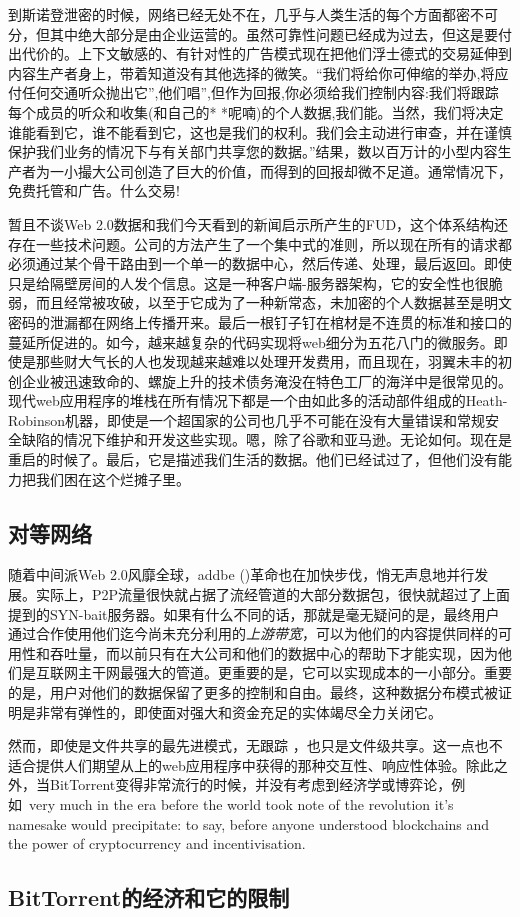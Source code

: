 到斯诺登泄密的时候，网络已经无处不在，几乎与人类生活的每个方面都密不可分，但其中绝大部分是由企业运营的。虽然可靠性问题已经成为过去，但这是要付出代价的。上下文敏感的、有针对性的广告模式现在把他们浮士德式的交易延伸到内容生产者身上，带着知道没有其他选择的微笑。“我们将给你可伸缩的举办,将应付任何交通听众抛出它”,他们唱”,但作为回报,你必须给我们控制内容:我们将跟踪每个成员的听众和收集(和自己的* *呢喃)的个人数据,我们能。当然，我们将决定谁能看到它，谁不能看到它，这也是我们的权利。我们会主动进行审查，并在谨慎保护我们业务的情况下与有关部门共享您的数据。”结果，数以百万计的小型内容生产者为一小撮大公司创造了巨大的价值，而得到的回报却微不足道。通常情况下，免费托管和广告。什么交易!

暂且不谈Web 2.0数据和我们今天看到的新闻启示所产生的FUD，这个体系结构还存在一些技术问题。公司的方法产生了一个集中式的准则，所以现在所有的请求都必须通过某个骨干路由到一个单一的数据中心，然后传递、处理，最后返回。即使只是给隔壁房间的人发个信息。这是一种客户端-服务器架构，它的安全性也很脆弱，而且经常被攻破，以至于它成为了一种新常态，未加密的个人数据甚至是明文密码的泄漏都在网络上传播开来。最后一根钉子钉在棺材是不连贯的标准和接口的蔓延所促进的。如今，越来越复杂的代码实现将web细分为五花八门的微服务。即使是那些财大气长的人也发现越来越难以处理开发费用，而且现在，羽翼未丰的初创企业被迅速致命的、螺旋上升的技术债务淹没在特色工厂的海洋中是很常见的。现代web应用程序的堆栈在所有情况下都是一个由如此多的活动部件组成的Heath-Robinson机器，即使是一个超国家的公司也几乎不可能在没有大量错误和常规安全缺陷的情况下维护和开发这些实现。嗯，除了谷歌和亚马逊。无论如何。现在是重启的时候了。最后，它是描述我们生活的数据。他们已经试过了，但他们没有能力把我们困在这个烂摊子里。


\subsection{对等网络\statusgreen}\label{sec:peer_to_peer}

随着中间派Web 2.0风靡全球，addbe ()革命也在加快步伐，悄无声息地并行发展。实际上，P2P流量很快就占据了流经管道的大部分数据包，很快就超过了上面提到的SYN-bait服务器。如果有什么不同的话，那就是毫无疑问的是，最终用户通过合作使用他们迄今尚未充分利用的\emph{上游带宽}，可以为他们的内容提供同样的可用性和吞吐量，而以前只有在大公司和他们的数据中心的帮助下才能实现，因为他们是互联网主干网最强大的管道。更重要的是，它可以实现成本的一小部分。重要的是，用户对他们的数据保留了更多的控制和自由。最终，这种数据分布模式被证明是非常有弹性的，即使面对强大和资金充足的实体竭尽全力关闭它。

然而，即使是文件共享的最先进模式，无跟踪 \cite{pouwelse2005bittorrent}，也只是文件级共享。这一点也不适合提供人们期望从上的web应用程序中获得的那种交互性、响应性体验。除此之外，当BitTorrent变得非常流行的时候，并没有考虑到经济学或博弈论，例如\ very much in the era before the world took note of the revolution it's namesake would precipitate: to say, before anyone understood blockchains and the power of cryptocurrency and incentivisation.\subsection{BitTorrent的经济和它的限制}

